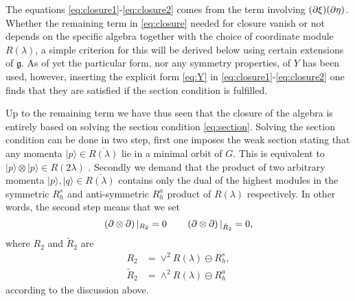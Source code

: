 The equations \eqref{eq:closure1}-\eqref{eq:closure2} comes from the term involving $(\partial\xi)(\partial\eta)$. Whether the remaining term in \eqref{eq:closure} needed for closure vanish or not depends on the specific algebra together with the choice of coordinate module $R(\lambda)$, a simple criterion for this will be derived below using certain extensions of $\mathfrak{g}$. As of yet the particular form, nor any symmetry properties, of $Y$ has been used, however, inserting the explicit form \eqref{eq:Y} in \eqref{eq:closure1}-\eqref{eq:closure2} one finds that they are satisfied if the section condition is fulfilled. 

Up to the remaining term we have thus seen that the closure of the algebra is entirely based on solving the section condition \eqref{eq:section}. Solving the section condition can be done in two step, first one imposes the weak section stating that any momenta $|p\rangle\in \overbar{R(\lambda)}$ lie in a minimal orbit of $G$. This is equivalent to $|p\rangle\otimes|p\rangle \in \overbar{R(2\lambda)}$ \cite{Berman2013,Bossard2017}. Secondly we demand that the product of two arbitrary momenta $|p\rangle,|q\rangle\in\overbar{R(\lambda)}$ contains only the dual of the highest modules in the symmetric $R^s_h$ and anti-symmetric $R^a_h$ product of $R(\lambda)$ respectively. In other words, the second step means that we set 
\begin{equation}
    \left(\partial\otimes\partial\right)|_{R_2} = 0 \qquad \left(\partial\otimes\partial\right)|_{\tilde{R}_2} =0,
\end{equation}
where $R_2$ and $\tilde{R}_2$ are
\begin{align}
    R_2 &= \vee^2 R(\lambda)\ominus R_h^s,\\
    \tilde{R}_2 &= \wedge^2R(\lambda)\ominus  R_h^a
\end{align}
according to the discussion above. 
